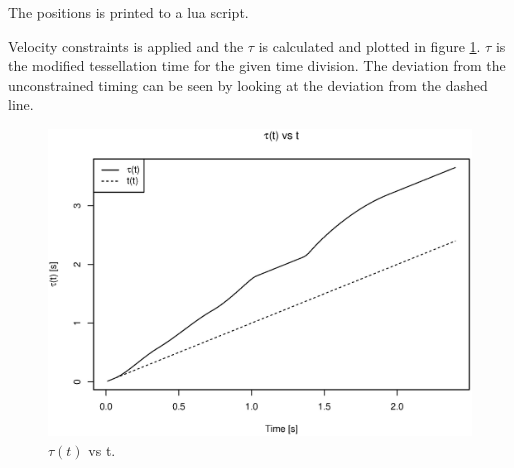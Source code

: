 The positions is printed to a lua script\cite{zip:luaScript}.

Velocity constraints is applied and the $\tau$ is calculated and plotted in figure \ref{fig:tau_v_t}.
$\tau$ is the modified tessellation time for the given time division.
The deviation from the unconstrained timing can be seen by looking at the deviation from the dashed line.

\begin{figure}[h]
 \centering
 \includegraphics[width=0.7\linewidth]{graphics/timeplot}
 \caption{$\tau(t)$ vs t.}
 \label{fig:tau_v_t}
\end{figure}
